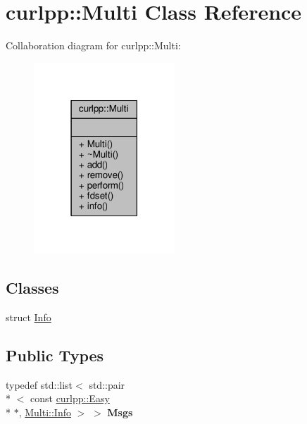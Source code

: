 \hypertarget{classcurlpp_1_1Multi}{\section{curlpp\-:\-:Multi Class Reference}
\label{classcurlpp_1_1Multi}
}


Collaboration diagram for curlpp\-:\-:Multi\-:
\nopagebreak
\begin{figure}[H]
\begin{center}
\leavevmode
\includegraphics[width=150pt]{classcurlpp_1_1Multi__coll__graph}
\end{center}
\end{figure}
\subsection*{Classes}
\begin{DoxyCompactItemize}
\item 
struct \hyperlink{structcurlpp_1_1Multi_1_1Info}{Info}
\end{DoxyCompactItemize}
\subsection*{Public Types}
\begin{DoxyCompactItemize}
\item 
\hypertarget{classcurlpp_1_1Multi_ab6a6fa294d6ff593449ae7152ca6d305}{typedef std\-::list$<$ std\-::pair\\*
$<$ const \hyperlink{classcurlpp_1_1Easy}{curlpp\-::\-Easy} \\*
$\ast$, \hyperlink{structcurlpp_1_1Multi_1_1Info}{Multi\-::\-Info} $>$ $>$ {\bfseries Msgs}}\label{classcurlpp_1_1Multi_ab6a6fa294d6ff593449ae7152ca6d305}

\end{DoxyCompactItemize}
